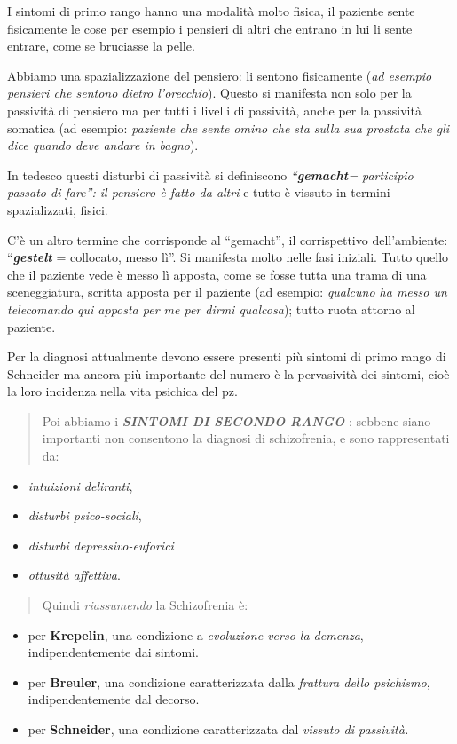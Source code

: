 \documentclass[]{article}
\begin{document}
I sintomi di primo rango hanno una modalità molto fisica, il paziente
sente fisicamente le cose per esempio i pensieri di altri che entrano in
lui li sente entrare, come se bruciasse la pelle.

Abbiamo una spazializzazione del pensiero: li sentono fisicamente
(\emph{ad esempio pensieri che sentono dietro l'orecchio}). Questo si
manifesta non solo per la passività di pensiero ma per tutti i livelli
di passività, anche per la passività somatica (ad esempio:
\emph{paziente che sente omino che sta sulla sua prostata che gli dice
quando deve andare in bagno}).

In tedesco questi disturbi di passività si definiscono
\emph{``\textbf{\emph{gemacht}}= participio passato di fare'': il
pensiero è fatto da altri} e tutto è vissuto in termini spazializzati,
fisici.

C'è un altro termine che corrisponde al ``gemacht'', il corrispettivo
dell'ambiente: ``\emph{\textbf{\emph{gestelt}}} = collocato, messo lì''.
Si manifesta molto nelle fasi iniziali. Tutto quello che il paziente
vede è messo lì apposta, come se fosse tutta una trama di una
sceneggiatura, scritta apposta per il paziente (ad esempio:
\emph{qualcuno ha messo un telecomando qui apposta per me per dirmi
qualcosa}); tutto ruota attorno al paziente.

Per la diagnosi attualmente devono essere presenti più sintomi di primo
rango di Schneider ma ancora più importante del numero è la pervasività
dei sintomi, cioè la loro incidenza nella vita psichica del pz.

\begin{quote}
Poi abbiamo i \textbf{\emph{SINTOMI DI SECONDO RANGO}} : sebbene siano
importanti non consentono la diagnosi di schizofrenia, e sono
rappresentati da:
\end{quote}

\begin{itemize}
\item
  \emph{intuizioni deliranti},
\item
  \emph{disturbi psico-sociali},
\item
  \emph{disturbi depressivo-euforici}
\item
  \emph{ottusità affettiva}.
\end{itemize}

\begin{quote}
Quindi \emph{riassumendo} la Schizofrenia è:
\end{quote}

\begin{itemize}
\item
  per \textbf{Krepelin}, una condizione a \emph{evoluzione verso la
  demenza}, indipendentemente dai sintomi.
\item
  per \textbf{Breuler}, una condizione caratterizzata dalla
  \emph{frattura dello psichismo}, indipendentemente dal decorso.
\item
  per \textbf{Schneider}, una condizione caratterizzata dal
  \emph{vissuto di passività.}
\end{itemize}
\end{document}
